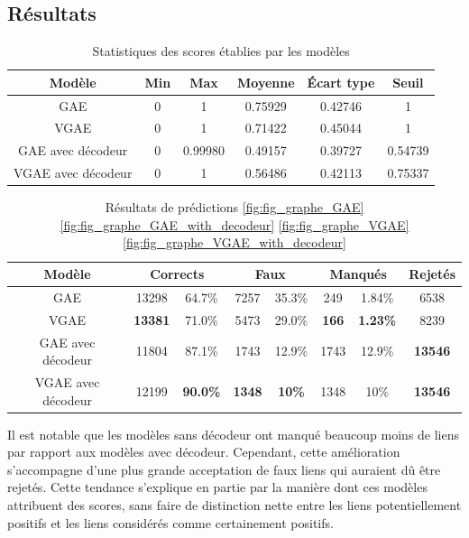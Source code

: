 \documentclass{article}
\begin{document}
\subsection{Résultats}

\begin{table}[H]
    \centering
    \begin{tabular}{|c|c|c|c|c|c|}
        \hline
        Modèle & Min & Max & Moyenne & Écart type & Seuil\\
        \hline
        GAE & 0 & 1 & 0.75929 & 0.42746 & 1\\
        VGAE & 0 & 1 & 0.71422 & 0.45044 & 1\\
        GAE avec décodeur & 0 & 0.99980 & 0.49157 & 0.39727 & 0.54739\\
        VGAE avec décodeur & 0 & 1 & 0.56486 & 0.42113 & 0.75337\\
        \hline
    \end{tabular}
    \caption{Statistiques des scores établies par les modèles}
    \label{tab:statistiques_scores}
\end{table}

\begin{table}[H]
    \centering
    \begin{tabular}{|c|c|c|c|c|c|c|c|}
        \hline
        Modèle & \multicolumn{2}{c|}{Corrects} & \multicolumn{2}{c|}{Faux} & \multicolumn{2}{c|}{Manqués} & Rejetés\\
        \hline
        GAE & 13298 & 64.7\% & 7257 & 35.3\% & 249 & 1.84\% & 6538\\
        VGAE & \textbf{13381} & 71.0\% & 5473 & 29.0\% & \textbf{166} & \textbf{1.23\%} & 8239\\
        GAE avec décodeur & 11804 & 87.1\% & 1743 & 12.9\% & 1743 & 12.9\% & \textbf{13546}\\
        VGAE avec décodeur & 12199 & \textbf{90.0\%} & \textbf{1348} & \textbf{10\%} & 1348 & 10\% & \textbf{13546}\\
         \hline
    \end{tabular}
    \caption{Résultats de prédictions \ref{fig:fig_graphe_GAE} \ref{fig:fig_graphe_GAE_with_decodeur} \ref{fig:fig_graphe_VGAE} \ref{fig:fig_graphe_VGAE_with_decodeur}}
    \label{tab:resultats_reconstruction}
\end{table}

Il est notable que les modèles sans décodeur ont manqué beaucoup moins de liens par rapport aux modèles avec décodeur. Cependant, cette amélioration s'accompagne d'une plus grande acceptation de faux liens qui auraient dû être rejetés. Cette tendance s'explique en partie par la manière dont ces modèles attribuent des scores, sans faire de distinction nette entre les liens potentiellement positifs et les liens considérés comme certainement positifs.
\end{document}
